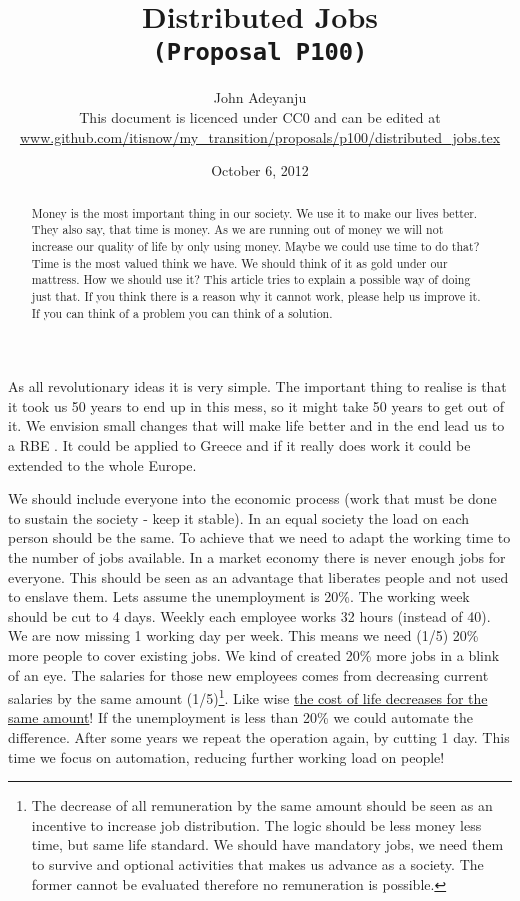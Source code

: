\documentclass{article}
\begin{document}
\title{Distributed Jobs \\\tt{\small{(Proposal P100)}}}
\author{John Adeyanju\\\small{This document is licenced under CC0 and can be edited at}\\ \footnotesize{\url{www.github.com/itisnow/my_transition/proposals/p100/distributed_jobs.tex}}}
\date{October 6, 2012}

\maketitle

\begin{abstract}
Money is the most important thing in our society.
We use it to make our lives better.
They also say, that time is money.
As we are running out of money we will not increase our quality of life by only using money.
Maybe we could use time to do that?
Time is the most valued think we have.
We should think of it as gold under our mattress.
How we should use it? 
This article tries to explain a possible way of doing just that.
If you think there is a reason why it cannot work, please help us improve it.
If you can think of a problem you can think of a solution.
\end{abstract}

As all revolutionary ideas it is very simple.
The important thing to realise is that it took us 50 years to end up in this mess, so it might take 50 years to get out of it.
We envision small changes that will make life better and in the end lead us to a RBE \cite{rbe}.
It could be applied to Greece and if it really does work it could be extended to the whole Europe.

We should include everyone into the economic process (work that must be done to sustain the society - keep it stable).
In an equal society the load on each person should be the same.
To achieve that we need to adapt the working time to the number of jobs available.
In a market economy there is never enough jobs for everyone.
This should be seen as an advantage that liberates people and not used to enslave them.
Lets assume the unemployment is 20\%.
The working week should be cut to 4 days.
Weekly each employee works 32 hours (instead of 40).
We are now missing 1 working day per week.
This means we need (1/5) 20\% more people to cover existing jobs.
We kind of created 20\% more jobs in a blink of an eye.
The salaries for those new employees comes from decreasing current salaries by the same amount (1/5)\footnote{The decrease of all remuneration by the same amount should be seen as an incentive to increase job distribution. The logic should be less money less time, but same life standard. We should have mandatory jobs, we need them to survive and optional activities that makes us advance as a society. The former cannot be evaluated therefore no remuneration is possible.}.
Like wise \underline{the cost of life decreases for the same amount}!
If the unemployment is less than 20\% we could automate the difference.
After some years we repeat the operation again, by cutting 1 day.
This time we focus on automation, reducing further working load on people!
\end{document}
